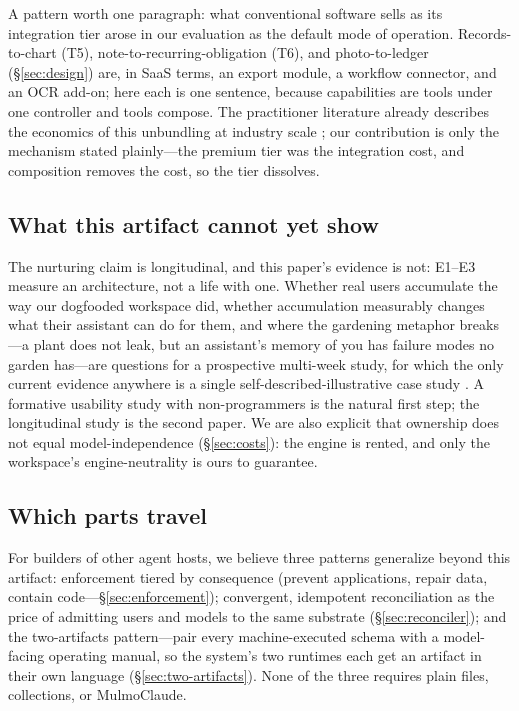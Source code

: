 \documentclass[11pt]{article}
\begin{document}
A pattern worth one paragraph: what conventional software sells as its
integration tier arose in our evaluation as the default mode of operation.
Records-to-chart (T5), note-to-recurring-obligation (T6), and photo-to-ledger
(\S\ref{sec:design}) are, in SaaS terms, an export module, a workflow connector,
and an OCR add-on; here each is one sentence, because capabilities are tools
under one controller and tools compose. The practitioner literature already
describes the economics of this unbundling at industry scale
\citep{saas-unbundling}; our contribution is only the mechanism stated
plainly---the premium tier was the integration cost, and composition removes the
cost, so the tier dissolves.

\subsection{What this artifact cannot yet show}
\label{sec:cannot-show}

The nurturing claim is longitudinal, and this paper's evidence is not: E1--E3
measure an architecture, not a life with one. Whether real users accumulate the
way our dogfooded workspace did, whether accumulation measurably changes what
their assistant can do for them, and where the gardening metaphor breaks---a
plant does not leak, but an assistant's memory of you has failure modes no garden
has---are questions for a prospective multi-week study, for which the only
current evidence anywhere is a single self-described-illustrative case study
\citep{nurture-first}. A formative usability study with non-programmers is the
natural first step; the longitudinal study is the second paper. We are also
explicit that ownership does not equal model-independence (\S\ref{sec:costs}):
the engine is rented, and only the workspace's engine-neutrality is ours to
guarantee.

\subsection{Which parts travel}
\label{sec:travel}

For builders of other agent hosts, we believe three patterns generalize beyond
this artifact: enforcement tiered by consequence (prevent applications, repair
data, contain code---\S\ref{sec:enforcement}); convergent, idempotent
reconciliation as the price of admitting users and models to the same substrate
(\S\ref{sec:reconciler}); and the two-artifacts pattern---pair every
machine-executed schema with a model-facing operating manual, so the system's two
runtimes each get an artifact in their own language (\S\ref{sec:two-artifacts}).
None of the three requires plain files, collections, or MulmoClaude.
\end{document}
